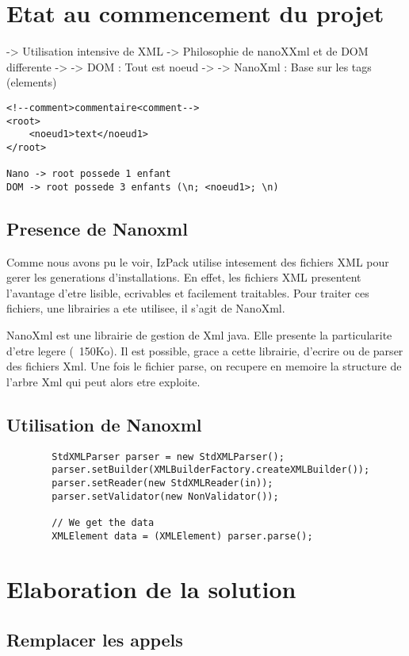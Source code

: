 \section{Etat au commencement du projet}
-> Utilisation intensive de XML
-> Philosophie de nanoXXml et de DOM differente
-> -> DOM : Tout est noeud
-> -> NanoXml : Base sur les tags (elements)
\begin{verbatim}
<!--comment>commentaire<comment-->
<root>
	<noeud1>text</noeud1>
</root>

Nano -> root possede 1 enfant
DOM -> root possede 3 enfants (\n; <noeud1>; \n)
\end{verbatim}
\subsection{Presence de Nanoxml}
Comme nous avons pu le voir, IzPack utilise intesement des fichiers XML pour gerer les generations d'installations. En effet, les fichiers XML presentent l'avantage d'etre lisible, ecrivables et facilement traitables. Pour traiter ces fichiers, une librairies a ete utilisee, il s'agit de NanoXml.

NanoXml est une librairie de gestion de Xml java. Elle presente la particularite d'etre legere (~150Ko). Il est possible, grace a cette librairie, d'ecrire ou de parser des fichiers Xml. Une fois le fichier parse, on recupere en memoire la structure de l'arbre Xml qui peut alors etre exploite.

\subsection{Utilisation de Nanoxml}
\begin{verbatim}
        StdXMLParser parser = new StdXMLParser();
        parser.setBuilder(XMLBuilderFactory.createXMLBuilder());
        parser.setReader(new StdXMLReader(in));
        parser.setValidator(new NonValidator());

        // We get the data
        XMLElement data = (XMLElement) parser.parse();
\end{verbatim}

\section{Elaboration de la solution}
\subsection{Remplacer les appels}
